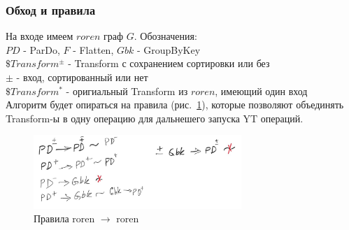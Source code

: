 \subsubsection{Обход и правила}

На входе имеем $roren$ граф $G$. Обозначения:\\
$PD$ - ParDo, $F$ - Flatten, $Gbk$ - GroupByKey\\
$\$Transform^{\pm}$ -  Transform с сохранением сортировки или без\\
$\pm$ - вход, сортированный или нет\\
$\$Transform^{*}$ - оригиальный Transform из $roren$, имеющий один вход\\
Алгоритм будет опираться на правила (рис.~\ref{fig:rule1}), которые позволяют объединять Transform-ы в одну операцию для дальнешего запуска YT операций.\\
\begin{figure}[h]
    \centering
    \includegraphics[width=0.7\textwidth]{img/rule1.jpeg}
    \caption{Правила roren $\xrightarrow{}$ roren}
    \label{fig:rule1}
\end{figure}

